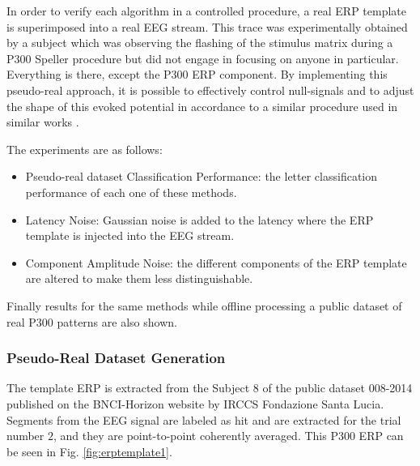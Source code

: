 \documentclass[brainsci,article,submit,moreauthors,pdftex,10pt,a4paper]{mdpi}
\begin{document}

In order to verify each algorithm in a controlled procedure, a real ERP template is superimposed into a real EEG stream.  This trace was experimentally obtained by a subject which was observing the flashing of the stimulus matrix during a P300 Speller procedure but did not engage in focusing on anyone in particular. Everything is there, except the P300 ERP component. By implementing this pseudo-real approach, it is possible to effectively control null-signals and to adjust the shape of this evoked potential in accordance to a similar procedure used in similar works \citep{Ouyang2017,Jaskowski2000,QuianQuiroga2003}.

The experiments are as follows:

\begin{itemize}
\item Pseudo-real dataset Classification Performance: the letter classification performance of each one of these methods.
\item Latency Noise: Gaussian noise is added to the latency where the ERP template is injected into the EEG stream.
\item Component Amplitude Noise: the different components of the ERP template are altered to make them less distinguishable.
\end{itemize}

Finally results for the same methods while offline processing a public dataset of real P300 patterns are also shown.

\subsubsection{Pseudo-Real Dataset Generation}

The template ERP is extracted from the Subject $8$ of the public dataset 008-2014  \citep{Riccio2013} published on the BNCI-Horizon website \citep{Brunner2014} by IRCCS Fondazione Santa Lucia. Segments from the EEG signal are labeled as hit and are extracted for the trial number $2$, and they are point-to-point coherently averaged.  This P300 ERP can be seen in Fig.  \ref{fig:erptemplate1}. 
\end{document}
